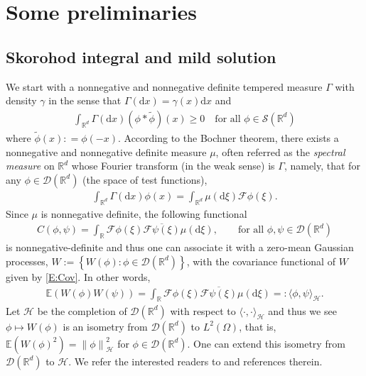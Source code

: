 \documentclass[12pt]{report}
\theoremstyle{plain}
\theoremstyle{definition}
\numberwithin{equation}{section}
\newcommand{\R}{\mathbb{R}}
\newcommand{\E}{\mathbb{E}}
\newcommand{\Norm}[1]{\left\|  #1   \right\|}
\newcommand{\ud}{\ensuremath{ \mathrm{d} }}
\begin{document}
\section{Some preliminaries} \label{S:Pre}

\subsection{Skorohod integral and mild solution} \label{SS:Malliavin}

We start with a nonnegative and nonnegative definite tempered measure $\Gamma$ with density $\gamma$
in the sense that $\Gamma(\ud x) = \gamma(x) \ud x$ and
\begin{align*}
\int_{\R^d} \Gamma(\ud x) (\phi * \widetilde{\phi})(x) \ge 0 \quad \text{for all $\phi \in \mathscr{S}(\R^d)$}
\end{align*}
where $\widetilde{\phi}(x): = \phi(-x)$.
According to the Bochner theorem, there exists a nonnegative and nonnegative definite measure $\mu$,
often referred as the {\it spectral measure} on $\R^d$ whose Fourier transform (in the weak sense)
is $\Gamma$, namely, that for any $\phi \in \mathcal{D}(\R^d)$ (the space of test functions),
\begin{align*}
\int_{\R^d}\Gamma(\ud x) \phi(x) = \int_{\R^d} \mu(\ud \xi) \mathcal{F}\phi (\xi).
\end{align*}
Since $\mu$ is nonnegative definite, the following functional
\begin{align} \label{E:Cov}
C(\phi,\psi) = \int_{\R} \mathcal{F}\phi(\xi) \overline{ \mathcal{F}\psi(\xi) } \mu(\ud \xi),
\qquad \text{for all $\phi,\psi\in\mathcal{D}(\R^d)$}
\end{align}
is nonnegative-definite and thus one can associate it with a zero-mean Gaussian processes, $W:=
\left\{ W(\phi) : \phi \in \mathcal{D}(\R^d) \right\}$, with the covariance functional of $W$ given
by \eqref{E:Cov}. In other words,
\begin{align*}
\mathbb{E}\left(W(\phi)W(\psi)\right)
= \int_{\R} \mathcal{F}\phi(\xi) \overline{ \mathcal{F}\psi(\xi) } \mu(\ud \xi)
=: \langle \phi, \psi \rangle_{\mathcal{H}}.
\end{align*}
Let $\mathcal{H}$ be the completion of $\mathcal{D}(\R^d)$ with respect to $\langle \cdot, \cdot
\rangle_{\mathcal{H}}$ and thus we see $\phi \mapsto W(\phi)$ is an isometry from
$\mathcal{D}(\R^d)$ to $L^2(\Omega)$, that is, $\E\left(W(\phi)^2\right) =
\Norm{\phi}_{\mathcal{H}}^2$ for $\phi\in \mathcal{D}(\R^d)$. One can extend this isometry from
$\mathcal{D}(\R^d)$ to $\mathcal{H}$. We refer the interested readers to \cite{dalang.khoshnevisan.ea:09:minicourse} and
references therein.  \bigskip
\end{document}

